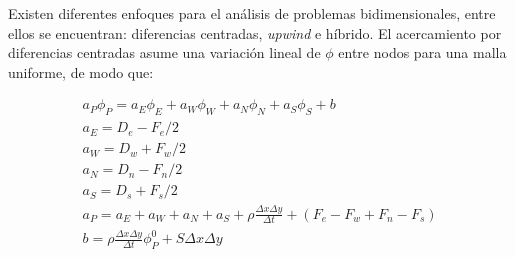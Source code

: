\noindent
\justify

Existen diferentes enfoques para el an\'alisis de problemas bidimensionales, entre ellos se encuentran: diferencias centradas, \textit{upwind} e h\'ibrido. El acercamiento por diferencias centradas asume una variaci\'on lineal de $\phi$ entre nodos para una malla uniforme, de modo que:

\begin{equation}
\begin{array}{c}
	a_P \phi _P = a_E \phi _E  + a_W \phi _W + a_N \phi _N + a_S \phi _S + b \\
	a_E = D_e - F_e/2 \\
	a_W = D_w + F_w/2 \\
	a_N = D_n - F_n/2 \\
	a_S = D_s + F_s/2 \\
	a_P = a_E + a_W + a_N + a_S + \rho \frac{\Delta x \Delta y}{\Delta t} + \left(F_e - F_w + F_n - F_s \right) \\
	b = \rho \frac{\Delta x \Delta y}{\Delta t} \phi _P ^0 + S \Delta x \Delta y
\end{array}
\end{equation}